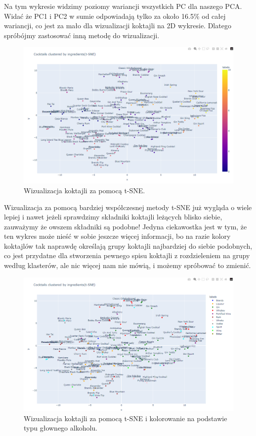 \documentclass{article}
\begin{document}
Na tym wykresie widzimy poziomy wariancji wszystkich PC dla naszego PCA. Widać że PC1 i PC2 w sumie odpowiadają tylko za około 16.5\% od całej wariancji, co jest za mało dla wizualizacji koktajli na 2D wykresie. Dlatego spróbójmy zastosować inną metodę do wizualizacji.

\begin{figure}[h]
\centering
    \includegraphics[width=1\linewidth]{cluster_3.png}
    \caption{Wizualizacja koktajli za pomocą t-SNE.}
\end{figure}

Wizualizacja za pomocą bardziej współczesnej metody t-SNE już wygląda o wiele lepiej i nawet jeżeli sprawdzimy składniki koktajli leżących blisko siebie, zauważymy że owszem składniki są podobne! 
\newline
Jedyna ciekawostka jest w tym, że ten wykres może nieść w sobie jeszcze więcej informacji, bo na razie kolory koktajlów tak naprawdę określają grupy koktajli najbardziej do siebie podobnych, co jest przydatne dla stworzenia pewnego spisu koktajli z rozdzieleniem na grupy według klasterów, ale nic więcej nam nie mówią, i możemy spróbować to zmienić.

\clearpage

\begin{figure}[h]
\centering
    \includegraphics[width=1\linewidth]{cluster_4.png}
    \caption{Wizualizacja koktajli za pomocą t-SNE i kolorowanie na podstawie typu głownego alkoholu.}
\end{figure}
\end{document}
